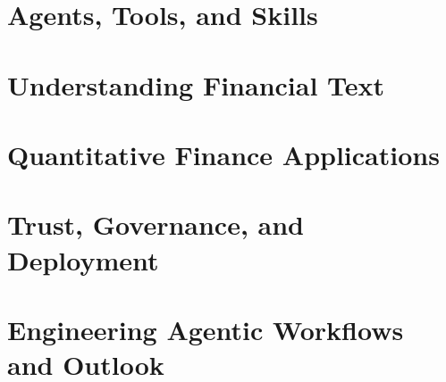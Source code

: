 \documentclass[12pt, openany, twoside]{book}
\begin{document}
\part{Agents, Tools, and Skills}


\part{Understanding Financial Text}



\part{Quantitative Finance Applications}




\part{Trust, Governance, and Deployment}





\part{Engineering Agentic Workflows and Outlook}




\backmatter
\printbibliography[heading=bibintoc, title={References}]



% 
\end{document}
